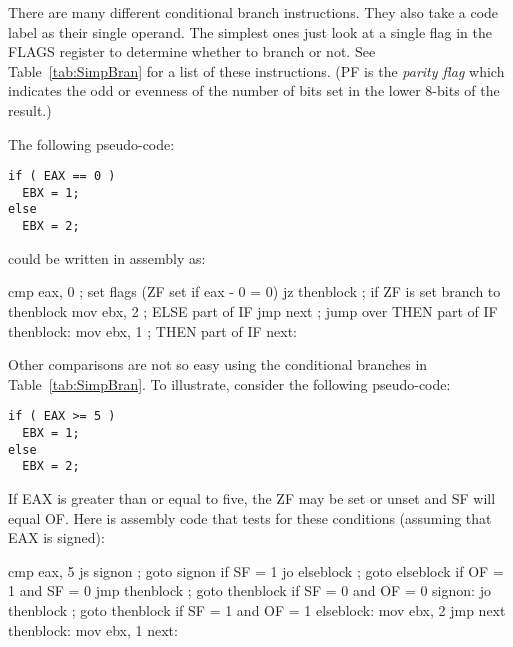 There are many different conditional branch instructions. They also
take a code label as their single operand. The simplest ones just look
at a single flag in the FLAGS register to determine whether to branch
or not.  See Table~\ref{tab:SimpBran} for a list of these
instructions. (PF is the \emph{parity flag} 
which indicates the odd or evenness of the number of bits set in the
lower 8-bits of the result.)

The following pseudo-code:
\begin{Verbatim}
if ( EAX == 0 )
  EBX = 1;
else
  EBX = 2;
\end{Verbatim}
could be written in assembly as:
\begin{AsmCodeListing}[frame=none]
      cmp    eax, 0            ; set flags (ZF set if eax - 0 = 0)
      jz     thenblock         ; if ZF is set branch to thenblock
      mov    ebx, 2            ; ELSE part of IF
      jmp    next              ; jump over THEN part of IF
thenblock:
      mov    ebx, 1            ; THEN part of IF
next:
\end{AsmCodeListing}

Other comparisons are not so easy using the conditional branches in 
Table~\ref{tab:SimpBran}. To illustrate, consider the following pseudo-code:
\begin{Verbatim}
if ( EAX >= 5 )
  EBX = 1;
else
  EBX = 2;
\end{Verbatim}
If EAX is greater than or equal to five, the ZF may be set or unset and SF
will equal OF. Here is assembly code that tests for these conditions 
(assuming that EAX is signed):
\begin{AsmCodeListing}[frame=none]
      cmp    eax, 5
      js     signon            ; goto signon if SF = 1
      jo     elseblock         ; goto elseblock if OF = 1 and SF = 0
      jmp    thenblock         ; goto thenblock if SF = 0 and OF = 0
signon:
      jo     thenblock         ; goto thenblock if SF = 1 and OF = 1
elseblock:
      mov    ebx, 2
      jmp    next
thenblock:
      mov    ebx, 1
next:
\end{AsmCodeListing}

